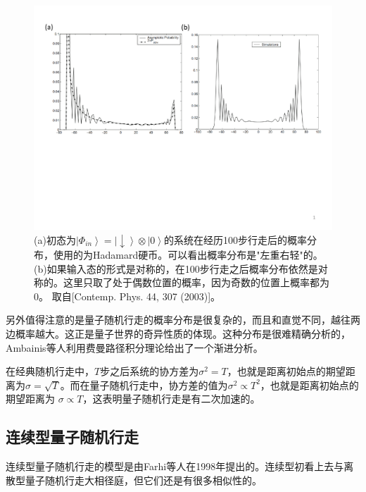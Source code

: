 \begin{figure}[htbp]
            \begin{center}
              \includegraphics[width= 0.8\columnwidth]{figures/rwsym.pdf}
              \caption{(a)初态为$\left\vert \Phi_{in} \right \rangle = \left\vert \downarrow \right \rangle \otimes \left\vert 0 \right \rangle$的系统在经历100步行走后的概率分布，使用的为Hadamard硬币。可以看出概率分布是"左重右轻"的。(b)如果输入态的形式是对称的，在100步行走之后概率分布依然是对称的。这里只取了处于偶数位置的概率，因为奇数的位置上概率都为0。
              取自[Contemp. Phys. 44, 307 (2003)]\cite{rwview2}。
              }
              \label{rwsym}
            \end{center}
 \end{figure}

另外值得注意的是量子随机行走的概率分布是很复杂的，而且和直觉不同，越往两边概率越大。这正是量子世界的奇异性质的体现。这种分布是很难精确分析的，
Ambainis等人利用费曼路径积分理论给出了一个渐进分析\cite{crw3}。

在经典随机行走中，$T$步之后系统的协方差为$\sigma^2 = T$，也就是距离初始点的期望距离为$\sigma = \sqrt{T}$。而在量子随机行走中，协方差的值为$\sigma^2 \propto T^2$，也就是距离初始点的期望距离为
$\sigma \propto T$，这表明量子随机行走是有二次加速的。

\subsection{连续型量子随机行走}

连续型量子随机行走的模型是由Farhi等人在1998年提出的\cite{crw4}。连续型初看上去与离散型量子随机行走大相径庭，但它们还是有很多相似性的。

